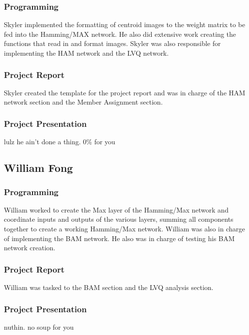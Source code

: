 \documentclass{article}
\begin{document}
\subsubsection{Programming}
Skyler implemented the formatting of centroid images to the weight matrix to be fed into the Hamming/MAX network. He also did extensive work creating the functions that read in and format images. Skyler was also responsible for implementing
the HAM network and the LVQ network.

\subsubsection{Project Report}
Skyler created the template for the project report and was in charge of the HAM 
network section and the Member Assignment section.

\subsubsection{Project Presentation}
lulz he ain't done a thing.  0\% for you

\subsection{William Fong}
\subsubsection{Programming}
William worked to create the Max layer of the Hamming/Max network and coordinate 
inputs and outputs of the various layers, summing all components together to create a working Hamming/Max network. William was also in charge of implementing the BAM network. He also was in charge of testing his BAM network creation.
\subsubsection{Project Report}
William was tasked to the BAM section and the LVQ analysis section.

\subsubsection{Project Presentation}
nuthin. no soup for you 
\end{document}
